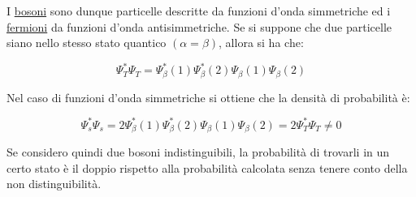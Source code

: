 I \underline{bosoni} sono dunque particelle descritte da funzioni d'onda simmetriche ed i \underline{fermioni} da funzioni d'onda antisimmetriche.
Se si suppone che due particelle siano nello stesso stato quantico $(\alpha = \beta)$, allora si ha che:

$$ \Psi_T^\ast \Psi_T = \Psi_\beta^\ast(1) \Psi_\beta^\ast(2) \Psi_\beta(1) \Psi_\beta(2) $$

Nel caso di funzioni d'onda simmetriche si ottiene che la densità di probabilità è:

$$ \Psi_s^\ast \Psi_s = 2 \Psi_\beta^\ast(1) \Psi_\beta^\ast(2) \Psi_\beta(1) \Psi_\beta(2) = 2 \Psi_T^\ast \Psi_T \not = 0 $$

Se considero quindi due bosoni indistinguibili, la probabilità di trovarli in un certo stato è il doppio rispetto alla probabilità calcolata senza tenere conto della non distinguibilità.










